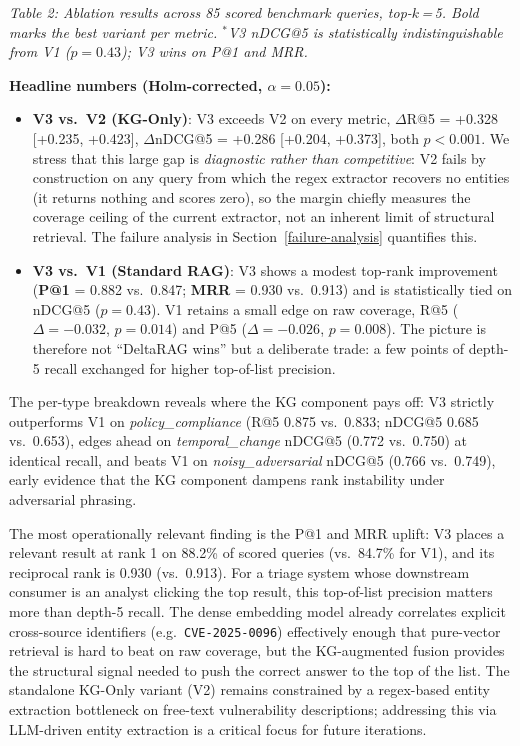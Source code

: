 \documentclass[
]{article}
\begin{document}
\emph{Table 2: Ablation results across 85 scored benchmark queries, top-$k$\,=\,5. Bold marks the best variant per metric. $^*$V3 nDCG@5 is statistically indistinguishable from V1 ($p = 0.43$); V3 wins on P@1 and MRR.}

\textbf{Headline numbers (Holm-corrected, $\alpha = 0.05$):}
\begin{itemize}
  \item \textbf{V3 vs.\ V2 (KG-Only)}: V3 exceeds V2 on every metric, $\Delta$R@5 = +0.328 [+0.235, +0.423], $\Delta$nDCG@5 = +0.286 [+0.204, +0.373], both $p < 0.001$. We stress that this large gap is \emph{diagnostic rather than competitive}: V2 fails by construction on any query from which the regex extractor recovers no entities (it returns nothing and scores zero), so the margin chiefly measures the coverage ceiling of the current extractor, not an inherent limit of structural retrieval. The failure analysis in Section~\ref{failure-analysis} quantifies this.
  \item \textbf{V3 vs.\ V1 (Standard RAG)}: V3 shows a modest top-rank improvement (\textbf{P@1} = 0.882 vs.\ 0.847; \textbf{MRR} = 0.930 vs.\ 0.913) and is statistically tied on nDCG@5 ($p = 0.43$). V1 retains a small edge on raw coverage, R@5 ($\Delta = -0.032$, $p = 0.014$) and P@5 ($\Delta = -0.026$, $p = 0.008$). The picture is therefore not ``DeltaRAG wins'' but a deliberate trade: a few points of depth-5 recall exchanged for higher top-of-list precision.
\end{itemize}

The per-type breakdown reveals where the KG component pays off: V3
strictly outperforms V1 on \textit{policy\_compliance} (R@5 0.875 vs.\ 0.833;
nDCG@5 0.685 vs.\ 0.653), edges ahead on \textit{temporal\_change} nDCG@5
(0.772 vs.\ 0.750) at identical recall, and beats V1 on
\textit{noisy\_adversarial} nDCG@5 (0.766 vs.\ 0.749), early evidence that
the KG component dampens rank instability under adversarial phrasing.

The most operationally relevant finding is the P@1 and MRR uplift: V3
places a relevant result at rank 1 on 88.2\% of scored queries
(vs.\ 84.7\% for V1), and its reciprocal rank is 0.930 (vs.\ 0.913). For a
triage system whose downstream consumer is an analyst clicking the top
result, this top-of-list precision matters more than depth-5 recall. The
dense embedding model already correlates explicit cross-source identifiers
(e.g.\ \texttt{CVE-2025-0096}) effectively enough that pure-vector retrieval
is hard to beat on raw coverage, but the KG-augmented fusion provides
the structural signal needed to push the correct answer to the top of the
list. The standalone KG-Only variant (V2) remains constrained by a
regex-based entity extraction bottleneck on free-text vulnerability
descriptions; addressing this via LLM-driven entity extraction is a
critical focus for future iterations.
\end{document}

